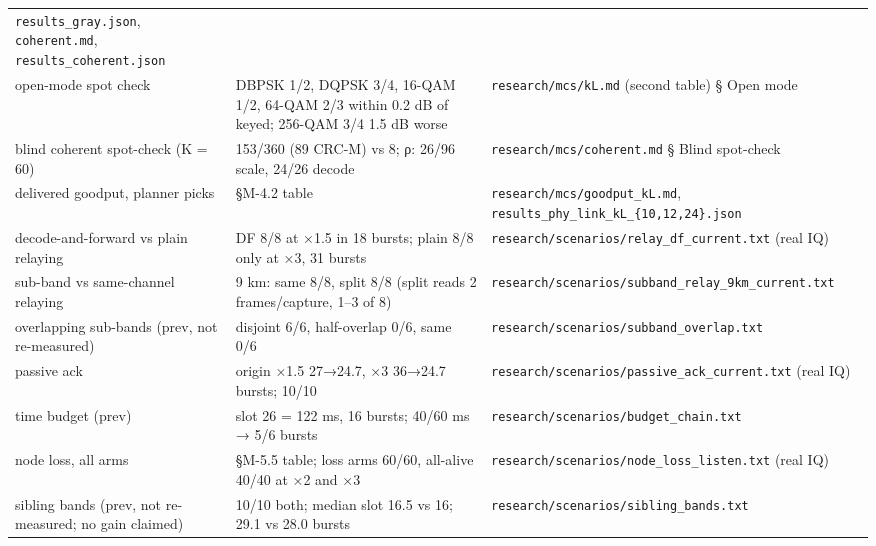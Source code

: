 \documentclass[10pt,letterpaper,twocolumn]{article}
\begin{document}
\begin{table}[tp]
\begin{tabular}{L{0.175\textwidth}L{0.545\textwidth}L{0.230\textwidth}}
\texttt{results\_\allowbreak{}gray.\allowbreak{}json},
\texttt{coherent.\allowbreak{}md},
\texttt{results\_\allowbreak{}coherent.\allowbreak{}json} \\
open-mode spot check & DBPSK 1/2, DQPSK 3/4, 16-QAM 1/2, 64-QAM 2/3 within 0.2 dB of keyed;
256-QAM 3/4 1.5 dB worse & \texttt{research/\allowbreak{}mcs/\allowbreak{}kL.\allowbreak{}md}
(second table) § Open mode \\
blind coherent spot-check (K = 60) & 153/360 (89 CRC-M) vs 8; ρ: 26/96 scale, 24/26 decode & \texttt{research/\allowbreak{}mcs/\allowbreak{}coherent.\allowbreak{}md}
§ Blind spot-check \\
delivered goodput, planner picks & §M-4.2 table & \texttt{research/\allowbreak{}mcs/\allowbreak{}goodput\_\allowbreak{}kL.\allowbreak{}md},
\texttt{results\_\allowbreak{}phy\_\allowbreak{}link\_\allowbreak{}kL\_\allowbreak{}\{10,\allowbreak{}12,\allowbreak{}24\}.\allowbreak{}json} \\
decode-and-forward vs plain relaying & DF 8/8 at ×1.5 in 18 bursts; plain 8/8 only at ×3, 31 bursts & \texttt{research/\allowbreak{}scenarios/\allowbreak{}relay\_\allowbreak{}df\_\allowbreak{}current.\allowbreak{}txt}
(real IQ) \\
sub-band vs same-channel relaying & 9 km: same 8/8, split 8/8 (split reads 2 frames/capture, 1--3 of 8) & \texttt{research/\allowbreak{}scenarios/\allowbreak{}subband\_\allowbreak{}relay\_\allowbreak{}9km\_\allowbreak{}current.\allowbreak{}txt} \\
overlapping sub-bands (prev, not re-measured) & disjoint 6/6, half-overlap 0/6, same 0/6 & \texttt{research/\allowbreak{}scenarios/\allowbreak{}subband\_\allowbreak{}overlap.\allowbreak{}txt} \\
passive ack & origin ×1.5 27→24.7, ×3 36→24.7 bursts; 10/10 & \texttt{research/\allowbreak{}scenarios/\allowbreak{}passive\_\allowbreak{}ack\_\allowbreak{}current.\allowbreak{}txt}
(real IQ) \\
time budget (prev) & slot 26 = 122 ms, 16 bursts; 40/60 ms → 5/6 bursts & \texttt{research/\allowbreak{}scenarios/\allowbreak{}budget\_\allowbreak{}chain.\allowbreak{}txt} \\
node loss, all arms & §M-5.5 table; loss arms 60/60, all-alive 40/40 at ×2 and ×3 & \texttt{research/\allowbreak{}scenarios/\allowbreak{}node\_\allowbreak{}loss\_\allowbreak{}listen.\allowbreak{}txt}
(real IQ) \\
sibling bands (prev, not re-measured; no gain claimed) & 10/10 both; median slot 16.5 vs 16; 29.1 vs 28.0 bursts & \texttt{research/\allowbreak{}scenarios/\allowbreak{}sibling\_\allowbreak{}bands.\allowbreak{}txt} \\

\end{tabular}
\end{table}
\end{document}
